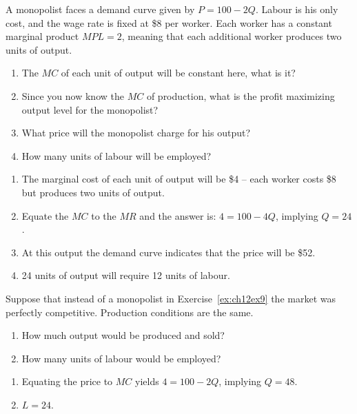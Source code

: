 \begin{enumialphparenastyle}
\begin{ex}\label{ex:ch12ex9}
A monopolist faces a demand curve given by $P=100-2Q$. Labour is his only cost, and the wage rate is fixed at \$8 per worker. Each worker has a constant marginal product $MPL=2$, meaning that each additional worker produces two units of output.
\begin{enumerate}
	\item	The $MC$ of each unit of output will be constant here, what is it?
	\item	Since you now know the $MC$ of production, what is the profit maximizing output level for the monopolist?
	\item	What price will the monopolist charge for his output?
	\item	How many units of labour will be employed?
\end{enumerate}
\begin{sol}
\begin{enumerate}
	\item	The marginal cost of each unit of output will be \$4 -- each worker costs \$8 but produces two units of output.
	\item	Equate the $MC$ to the $MR$ and the answer is: $4=100-4Q$, implying $Q=24$.
	\item	At this output the demand curve indicates that the price will be \$52.
	\item	24 units of output will require 12 units of labour.
\end{enumerate}
\end{sol}
\end{ex}

\begin{ex}\label{ex:ch12ex10}
Suppose that instead of a monopolist in Exercise~\ref{ex:ch12ex9} the market was perfectly competitive. Production conditions are the same.
\begin{enumerate}
	\item	How much output would be produced and sold?
	\item	How many units of labour would be employed?
\end{enumerate}
\begin{sol}
\begin{enumerate}
	\item	Equating the price to $MC$ yields $4=100-2Q$, implying $Q=48$.
	\item	$L=24$.
\end{enumerate}
\end{sol}
\end{ex}


\end{enumialphparenastyle}